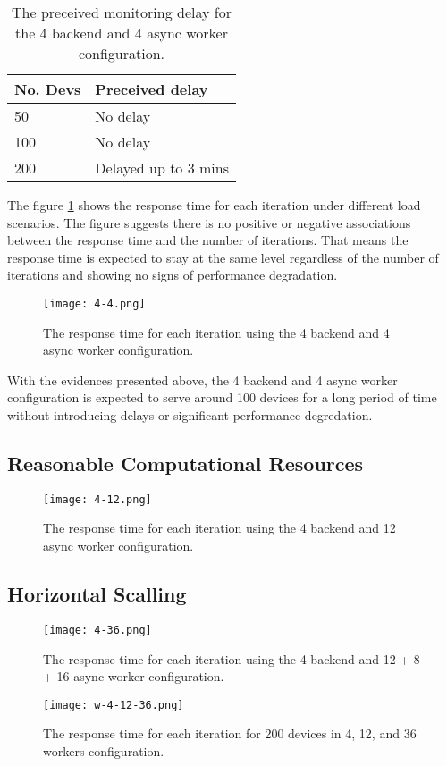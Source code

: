\documentclass[../thesis.tex]{subfiles}
\begin{document}
\begin{table}[h!]
	\begin{center}
		\caption{The preceived monitoring delay for the 4 backend and 4 async worker configuration.}
		\label{tab:delay4-4}
		\begin{tabular}{l|l}
			\toprule
			\textbf{No. Devs} & \textbf{Preceived delay}\\
			\midrule
			50 & No delay \\
			100 & No delay\\
			200 & Delayed up to 3 mins\\
			\bottomrule
		\end{tabular}
	\end{center}
\end{table}

The figure \ref{fig:4-4} shows the response time for each iteration under different load scenarios. The figure suggests there is no positive or negative associations between the response time and the number of iterations. That means the response time is expected to stay at the same level regardless of the number of iterations and showing no signs of performance degradation. 

\begin{figure}[!ht]
	\centering
	\texttt{[image: 4-4.png]}
	\caption{The response time for each iteration using the 4 backend and 4 async worker configuration.}
	\label{fig:4-4}
\end{figure}

With the evidences presented above, the 4 backend and 4 async worker configuration is expected to serve around 100 devices for a long period of time without introducing delays or significant performance degredation. 

\subsection{Reasonable Computational Resources}

\begin{figure}[!ht]
	\centering
	\texttt{[image: 4-12.png]}
	\caption{The response time for each iteration using the 4 backend and 12 async worker configuration.}
	\label{fig:4-12}
\end{figure}

\subsection{Horizontal Scalling}

\begin{figure}[!ht]
	\centering
	\texttt{[image: 4-36.png]}
	\caption{The response time for each iteration using the 4 backend and 12 + 8 + 16 async worker configuration.}
	\label{fig:4-36}
\end{figure}

\begin{figure}[!ht]
	\centering
	\texttt{[image: w-4-12-36.png]}
	\caption{The response time for each iteration for 200 devices in 4, 12, and 36 workers configuration.}
	\label{fig:w-4-12-36}
\end{figure}
\end{document}
